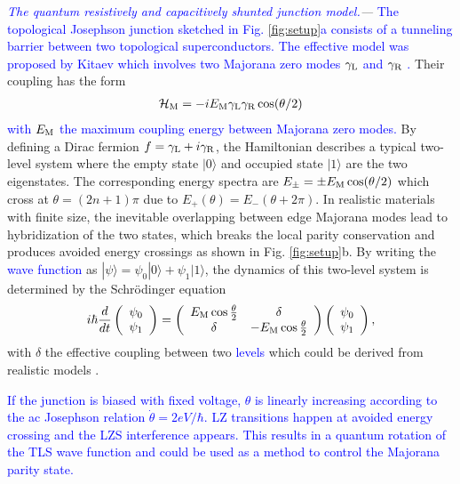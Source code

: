 \documentclass[aps,prl,twocolumn,showpacs,showpacs,10pt,superscriptaddress]{revtex4-1}
\newcommand{\blue}[1]{\textcolor{blue}{#1}}
\begin{document}
{\it \blue{The quantum resistively and capacitively shunted junction model.}---}
\blue{The topological Josephson junction sketched in Fig. \ref{fig:setup}a consists of a tunneling barrier between two topological superconductors\cite{marcus16,kouwenhoven15,yazdani14}. The effective model was proposed by Kitaev which involves two Majorana zero modes $\gamma_{\rm L}$ and $\gamma_{\rm R}$ \cite{kitaev01}.} Their coupling has the form \cite{fuprb09}
\begin{eqnarray}\label{eq:MJE}
\mathcal{H}_{\rm M} = -i E_{\rm M} \gamma_{\rm L}\gamma_{\rm R}\cos({\theta}/{2})
\end{eqnarray}
\blue{with $E_{\rm M}$ the maximum coupling energy between Majorana zero modes.} By defining a Dirac fermion $f = \gamma_{\rm L} + i \gamma_{\rm R}$, the Hamiltonian describes a typical two-level system where the empty state $|0\rangle$ and occupied state $|1\rangle$ are the two eigenstates. The corresponding energy spectra are $E_{\pm} = \pm E_{\rm M} \cos({\theta}/{2})$ which cross at $\theta = (2n+1)\pi$ due to $E_{+}(\theta) = E_{-}(\theta + 2\pi)$. In realistic materials with finite size, the inevitable overlapping between edge Majorana modes lead to hybridization of the two states, which breaks the local parity conservation and produces avoided energy crossings as shown in Fig. \ref{fig:setup}b. By writing the \blue{wave function} as $|\psi \rangle = \psi_0  |0\rangle +  \psi_1  |1\rangle$, the dynamics of this two-level system is determined by the Schr\"{o}dinger equation
\begin{eqnarray}\label{eq:SE}
i \hbar \frac{d}{dt} \left(\begin{array}{cc}
\psi_0  \\
\psi_1
\end{array}\right) = \left(\begin{array}{cc}
E_{\rm M}\cos{\frac{\theta}{2}} & \delta\\
\delta & -E_{\rm M}\cos{\frac{\theta}{2}}
\end{array}\right) \left(\begin{array}{cc}
\psi_0  \\
\psi_1
\end{array}\right),
\end{eqnarray}
with $\delta$ the effective coupling between two \blue{levels} which could be derived from realistic models \cite{supplement}. 

\blue{If the junction is biased with fixed voltage, $\theta$ is linearly increasing according to the ac Josephson relation $\dot \theta = 2eV /\hbar$. LZ transitions happen at avoided energy crossing and the LZS interference appears. This results in a quantum rotation of the TLS wave function and could be used as a method to control the Majorana parity state.}
\end{document}
